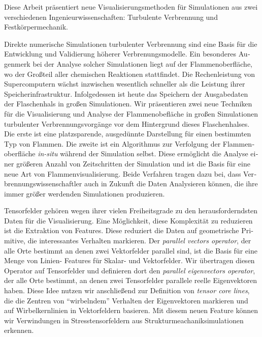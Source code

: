 \begin{otherlanguage}{german}%
%
Diese Arbeit pr\"asentiert neue Visualisierungsmethoden f\"ur Simulationen aus
zwei verschiedenen Ingenieurwissenschaften: Turbulente Verbrennung und
Festk\"orpermechanik.
%

%
Direkte numerische Simulationen turbulenter Verbrennung sind eine Basis f\"ur
die Entwicklung und Validierung h\"oherer Verbrenungsmodelle.
%
Ein besonderes Augenmerk bei der Analyse solcher Simulationen liegt auf der
Flammenoberfl\"ache, wo der Gro\ss{}teil aller chemischen Reaktionen stattfindet.
%
Die Rechenleistung von Supercomputern w\"achst inzwischen wesentlich schneller als
die Leistung ihrer Speicherinfrastruktur.
%
Infolgedessen ist heute das Speichern der Ausgabedaten der Flaschenhals in
gro\ss{}en Simulationen.
%
Wir pr\"asentieren zwei neue Techniken f\"ur die Visualisierung und Analyse der
Flammenobefl\"ache in gro\ss{}en Simulationen turbulenter Verbrennungsvorg\"ange
vor dem Hintergrund dieses Flaschenhalses.
%
Die erste ist eine platzsparende, ausged\"unnte Darstellung f\"ur einen
bestimmten Typ von Flammen.
%
Die zweite ist ein Algorithmus zur Verfolgung der Flammenoberfl\"ache
\emph{in-situ} w\"ahrend der Simulation selbst.
%
Diese erm\"oglicht die Analyse einer gr\"o\ss{}eren Anzahl von Zeitschritten der
Simulation und ist die Basis f\"ur eine neue Art von Flammenvisualisierung.
%
Beide Verfahren tragen dazu bei, dass Verbrennungswissenschaftler auch in
Zukunft die Daten Analysieren k\"onnen, die ihre immer gr\"o\ss{}er werdenden
Simulationen produzieren.
%

%
Tensorfelder geh\"oren wegen ihrer vielen Freiheitsgrade zu den
herausforderndsten Daten f\"ur die Visualisierung.
%
Eine M\"oglichkeit, diese Komplexit\"at zu reduzieren ist die Extraktion von
Features.
%
Diese reduziert die Daten auf geometrische Primitive, die interessantes
Verhalten markieren.
%
Der \emph{parallel vectors operator}, der alle Orte bestimmt an denen zwei
Vektorfelder parallel sind, ist die Basis f\"ur eine Menge von Linien- Features
f\"ur Skalar- und Vektorfelder.
%
Wir übertragen diesen Operator auf Tensorfelder und definieren dort den
\emph{parallel eigenvectors operator}, der alle Orte bestimmt, an denen zwei
Tensorfelder parallele reelle Eigenvektoren haben.
%
Diese Idee nutzen wir anschlie\ss{}end zur Definition von \emph{tensor core
lines}, die die Zentren von ``wirbelndem'' Verhalten der Eigenvektoren markieren
und auf Wirbelkernlinien in Vektorfeldern basieren.
%
Mit diesem neuen Feature k\"onnen wir Verwindungen in Stresstensorfeldern aus
Strukturmeachaniksimulationen erkennen.
%
\end{otherlanguage}%